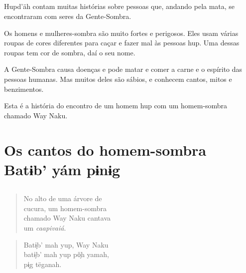 \chapter*{}
\thispagestyle{empty}

\vspace*{\fill}
 Hupd'äh contam muitas histórias sobre pessoas que, andando pela mata, se
encontraram com seres da Gente-Sombra.

Os homens e mulheres-sombra são muito fortes e perigosos. Eles usam várias roupas de cores diferentes para caçar e fazer mal às pessoas hup. Uma dessas roupas tem cor de sombra,
daí o seu nome.

A Gente-Sombra causa doenças e pode matar e comer a carne e o espírito das pessoas humanas. Mas muitos deles são sábios, e conhecem cantos, mitos e benzimentos.

Esta é a história do encontro de um homem hup com um homem-sombra chamado Way Naku.
\vspace*{\fill}

\openany%

\blankpage
\part[Os cantos do homem-sombra]{Os cantos do homem-sombra\\Batɨ\´b’ yám pɨnɨ\´g}


\chapter*{}

\mbox{}\vspace*{\fill}

\begin{verse}
No alto de uma árvore de\\
cucura, um homem-sombra\\
chamado Way Naku cantava\\
um \textit{caapivaiá}.
\end{verse}

\begin{verse}
Batɨ̗b’ mah yup, Way Naku\\
batɨ̗b’ mah yup pö̗h yamah,\\
pɨ̗g tëganah.
\end{verse}

\vspace*{\fill}

\blankpage

